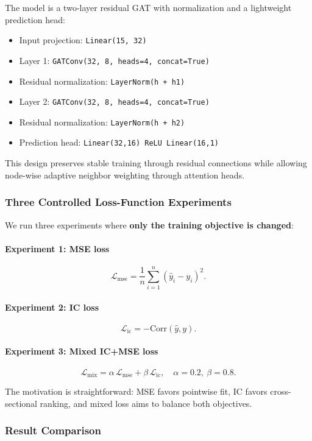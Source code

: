 The model is a two-layer residual GAT with normalization and a lightweight prediction head:
\begin{itemize}
\item Input projection: \texttt{Linear(15, 32)}
\item Layer 1: \texttt{GATConv(32, 8, heads=4, concat=True)}
\item Residual normalization: \texttt{LayerNorm(h + h1)}
\item Layer 2: \texttt{GATConv(32, 8, heads=4, concat=True)}
\item Residual normalization: \texttt{LayerNorm(h + h2)}
\item Prediction head: \texttt{Linear(32,16) \rightarrow ReLU \rightarrow Linear(16,1)}
\end{itemize}

This design preserves stable training through residual connections while allowing node-wise adaptive neighbor weighting through attention heads.

\subsubsection{Three Controlled Loss-Function Experiments}

We run three experiments where \textbf{only the training objective is changed}:

\paragraph{Experiment 1: MSE loss}
\[
\mathcal{L}_{\mathrm{mse}}=\frac{1}{n}\sum_{i=1}^n(\hat{y}_i-y_i)^2.
\]

\paragraph{Experiment 2: IC loss}
\[
\mathcal{L}_{\mathrm{ic}}=-\mathrm{Corr}(\hat{y},y).
\]

\paragraph{Experiment 3: Mixed IC+MSE loss}
\[
\mathcal{L}_{\mathrm{mix}}=\alpha\,\mathcal{L}_{\mathrm{mse}}+\beta\,\mathcal{L}_{\mathrm{ic}},
\quad \alpha=0.2,\ \beta=0.8.
\]

The motivation is straightforward: MSE favors pointwise fit, IC favors cross-sectional ranking, and mixed loss aims to balance both objectives.

\subsubsection{Result Comparison}

